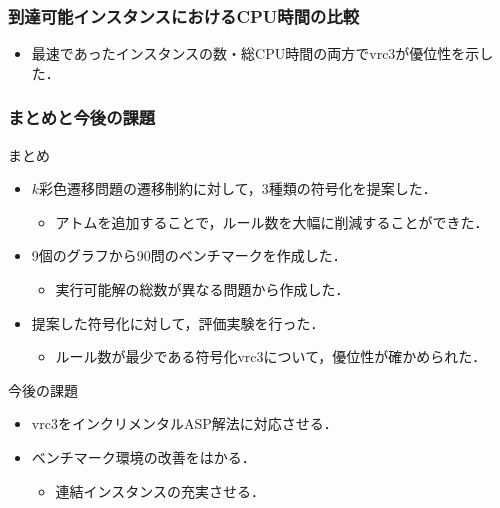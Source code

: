 \documentclass[dvipdfmx,11pt]{beamer}
\begin{document}

\begin{frame}\frametitle{到達可能インスタンスにおけるCPU時間の比較}

  \begin{table}[t]
    \centering
      
  \end{table}

  \begin{itemize}
    \item 最速であったインスタンスの数・総CPU時間の両方で\alert{vrc3が優位性を示した}．
  \end{itemize}
  
\end{frame}


\begin{frame}\frametitle{まとめと今後の課題}

  \begin{block}{まとめ}
    \begin{itemize}
      \item $k$彩色遷移問題の遷移制約に対して，3種類の符号化を提案した．
      \begin{itemize}
        \item アトムを追加することで，ルール数を大幅に削減することができた．
      \end{itemize}
      \item 9個のグラフから90問のベンチマークを作成した．
      \begin{itemize}
        \item 実行可能解の総数が異なる問題から作成した．
      \end{itemize}
      \item 提案した符号化に対して，評価実験を行った．
      \begin{itemize}
        \item ルール数が最少である符号化vrc3について，優位性が確かめられた．
      \end{itemize}
    \end{itemize}
  \end{block}
  
  \begin{alertblock}{今後の課題}
    \begin{itemize}
      \item vrc3をインクリメンタルASP解法に対応させる．
      \item ベンチマーク環境の改善をはかる．
      \begin{itemize}
        \item 連結インスタンスの充実させる．
      \end{itemize}
    \end{itemize}
  \end{alertblock}

\end{frame}



\end{document}
